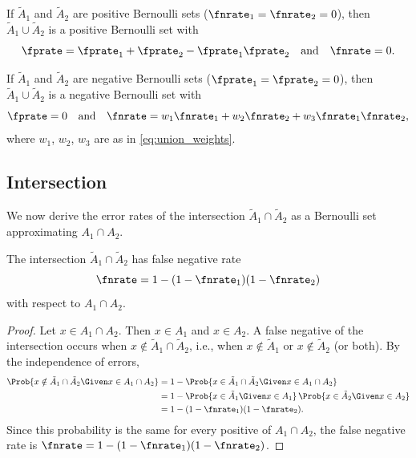 \begin{corollary}
\label{cor:union_positive}
If $\tilde{A}_1$ and $\tilde{A}_2$ are positive Bernoulli sets
($\fnrate_1 = \fnrate_2 = 0$), then $\tilde{A}_1 \cup \tilde{A}_2$ is a
positive Bernoulli set with
\begin{equation}
\fprate = \fprate_1 + \fprate_2 - \fprate_1 \fprate_2
\quad \text{and} \quad
\fnrate = 0.
\end{equation}
\end{corollary}

\begin{corollary}
\label{cor:union_negative}
If $\tilde{A}_1$ and $\tilde{A}_2$ are negative Bernoulli sets
($\fprate_1 = \fprate_2 = 0$), then $\tilde{A}_1 \cup \tilde{A}_2$ is a
negative Bernoulli set with
\begin{equation}
\fprate = 0
\quad \text{and} \quad
\fnrate = w_1 \fnrate_1 + w_2 \fnrate_2
        + w_3 \fnrate_1 \fnrate_2,
\end{equation}
where $w_1$, $w_2$, $w_3$ are as in \cref{eq:union_weights}.
\end{corollary}

\subsection{Intersection}
\label{sec:intersection}
We now derive the error rates of the intersection
$\tilde{A}_1 \cap \tilde{A}_2$ as a Bernoulli set approximating
$A_1 \cap A_2$.

\begin{theorem}
\label{thm:intersect_fnrate}
The intersection $\tilde{A}_1 \cap \tilde{A}_2$ has false negative rate
\begin{equation}
\label{eq:intersect_fnr}
\fnrate = 1 - (1 - \fnrate_1)(1 - \fnrate_2)
\end{equation}
with respect to $A_1 \cap A_2$.
\end{theorem}
\begin{proof}
Let $x \in A_1 \cap A_2$.
Then $x \in A_1$ and $x \in A_2$.
A false negative of the intersection occurs when
$x \notin \tilde{A}_1 \cap \tilde{A}_2$, i.e., when
$x \notin \tilde{A}_1$ or $x \notin \tilde{A}_2$ (or both).
By the independence of errors,
\begin{align}
\Prob{x \notin \tilde{A}_1 \cap \tilde{A}_2
    \Given x \in A_1 \cap A_2}
&= 1 - \Prob{x \in \tilde{A}_1 \cap \tilde{A}_2
    \Given x \in A_1 \cap A_2} \\
&= 1 - \Prob{x \in \tilde{A}_1 \Given x \in A_1}\,
       \Prob{x \in \tilde{A}_2 \Given x \in A_2} \\
&= 1 - (1 - \fnrate_1)(1 - \fnrate_2).
\end{align}
Since this probability is the same for every positive of $A_1 \cap A_2$,
the false negative rate is $\fnrate = 1 - (1 - \fnrate_1)(1 - \fnrate_2)$.
\end{proof}

